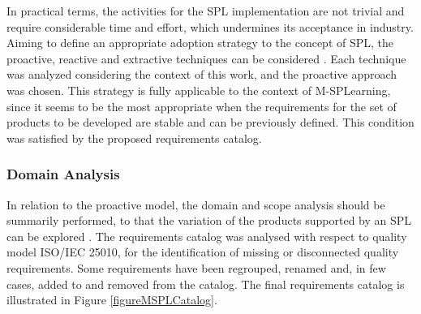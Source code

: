In practical terms, the activities for the SPL implementation are not trivial and require considerable time and effort, which undermines its acceptance in industry. Aiming to define an appropriate adoption strategy to the concept of SPL, the proactive, reactive and extractive techniques can be considered \cite{krueger02}.
Each technique was analyzed considering the context of this work, and the proactive approach was chosen. This strategy is fully applicable to the context of M-SPLear\allowbreak ning, since it seems to be the most appropriate when the requirements for the set of products to be developed are stable and can be previously defined. This condition was satisfied by the proposed requirements catalog.

\subsubsection{Domain Analysis}\label{domainAnalysis}

In relation to the proactive model, the domain and scope analysis should be summarily performed, to that the variation of the products supported by an SPL can be explored \cite{krueger02}. The requirements catalog \cite{filho13} was analysed with respect to quality model ISO/IEC 25010, for the identification of missing or disconnected quality requirements.
Some requirements have been regrouped, renamed and, in few cases, added to and removed from the catalog. The final requirements catalog is illustrated in Figure \ref{figureMSPLCatalog}.

